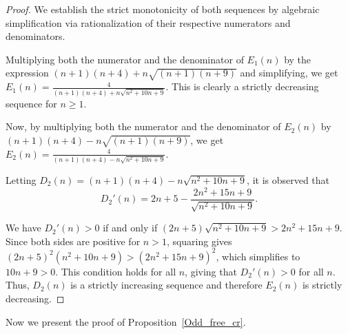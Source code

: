 \documentclass[12pt]{article}
\begin{document}
	\begin{proof}
		We establish the strict monotonicity of both sequences by algebraic simplification via rationalization of their respective numerators and denominators.
		 
		Multiplying both the numerator and the denominator of $E_1(n)$ by the expression $ (n+1)(n+4) + n\sqrt{(n+1)(n+9)}$ and simplifying, we get 
%			
			 $E_1(n) = \frac{4}{(n+1)(n+4) + n\sqrt{n^2+10n+9}}.$ 
%			
This is clearly a strictly decreasing sequence for $n \geq 1$.
			
		 Now, by multiplying both the numerator and the denominator of $E_2(n)$ by $ (n+1)(n+4) - n\sqrt{(n+1)(n+9)}$, we get
			 $E_2(n) = \frac{4}{(n+1)(n+4) - n\sqrt{n^2+10n+9}}.$ 
			
			Letting $D_2(n) = (n+1)(n+4) - n\sqrt{n^2+10n+9}$, it is observed that
			$$D_2'(n) = 2n+5 - \frac{2n^2+15n+9}{\sqrt{n^2+10n+9}}.$$ 
			
			We have $D_2'(n)>0$ if and only if $(2n+5)\sqrt{n^2+10n+9}>2n^2+15n+9$. Since both sides are positive for $n>1$, squaring gives $(2n+5)^2(n^2+10n+9)>(2n^2+15n+9)^2$, which simplifies to $10n+9>0$. This condition holds for all $n$, giving that $D_2'(n)>0$ for all $n$. Thus, $D_2(n)$ is a strictly increasing sequence and therefore $E_2(n)$ is strictly decreasing. 	\end{proof}	
	Now we present the proof of Proposition~\ref{Odd_free_cr}.
\end{document}
